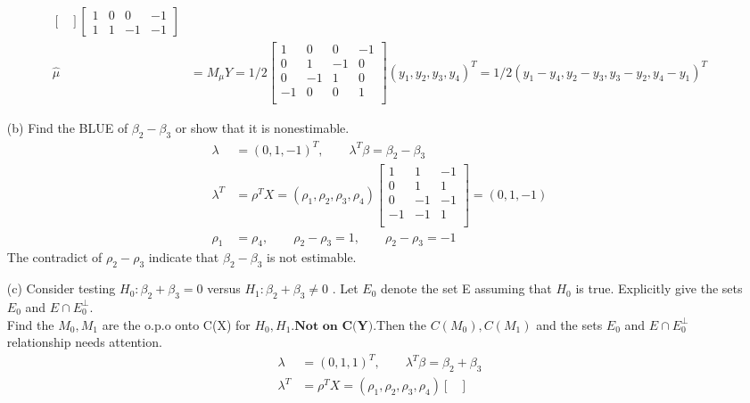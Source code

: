 \documentclass{homework}
\begin{document}
\begin{itemize}
\begin{align*}
\begin{bmatrix}
         \end{bmatrix}\begin{bmatrix}
           1 & 0 & 0 & -1    \\
           1 & 1 & -1 & -1
         \end{bmatrix}\\
       \hat{\mu} &= M_{\mu} Y =  1/2 \begin{bmatrix}
           1  & 0 & 0 & -1   \\
           0 &  1 & -1 & 0 \\
           0  & -1 & 1 & 0 \\
           -1 &  0 & 0 & 1 \\
         \end{bmatrix} (y_1, y_2, y_3, y_4)^T = 1/2 (y_1- y_4, y_2-y_3, y_3-y_2, y_4-y_1)^T
\end{align*}
\item[(b)] Find the BLUE of $\beta_2 - \beta_3$ or show that it is nonestimable.
\begin{align*}
    \lambda &= (0, 1,-1)^T, \qquad \lambda^T \beta = \beta_2 - \beta_3\\
    \lambda^T &= \rho^T X = (\rho_1, \rho_2, \rho_3, \rho_4)  \begin{bmatrix}
           1  & 1 & -1  \\
           0 &  1 & 1\\
           0  & -1 & -1  \\
           -1 &  -1 & 1\\
         \end{bmatrix} = (0, 1,-1)\\
         \rho_1 &= \rho_4, \qquad \rho_2 - \rho_3 = 1, \qquad \rho_2 - \rho_3 = -1
\end{align*}
The contradict of $\rho_2 - \rho_3$ indicate that  $\beta_2 - \beta_3$ is not estimable.
\item[(c)] Consider testing $H_0: \beta_2 + \beta_3 = 0$  versus $H_1: \beta_2 + \beta_3 \neq 0$ . Let $E_0$ denote the set E assuming that $H_0$ is true. Explicitly give the sets $E_0$ and $E \cap E_0^{\perp}$.\\
Find the $M_{0}, M_{1}$ are the o.p.o onto C(X) for $H_0, H_1$.$\textbf{Not on C(Y)}$.Then the $C(M_{0}), C(M_{1})$ and the sets $E_0$ and $E \cap E_0^{\perp}$ relationship needs attention.
\begin{align*}
    \lambda &= (0, 1, 1)^T, \qquad \lambda^T \beta = \beta_2 + \beta_3\\
    \lambda^T &= \rho^T X = (\rho_1, \rho_2, \rho_3, \rho_4)  \begin{bmatrix}

\end{bmatrix}
\end{align*}
\end{itemize}
\end{document}
